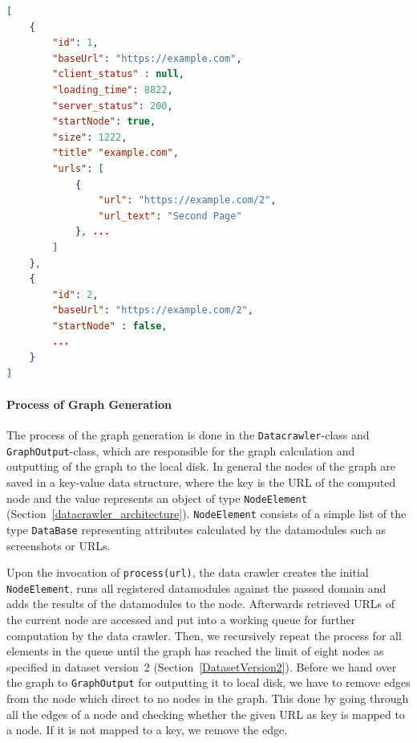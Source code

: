 \begin{lstlisting}[language=json,firstnumber=1,label={lst:examplecom_graph},
    language=Python,
    caption={[Example graph generated by the data crawler]Graph output for the domain \texttt{example.com}. The graph nodes are \texttt{JSON}-objects in the root array of the \texttt{JSON}-file. The \texttt{baseUrl}-attribute shows affiliation of the node to the given URL. Futhermore, each \texttt{JSON}-object consists of attributes mainly calculated in the URL-Datamodule such as client-sided and server-sided error (here: \texttt{client\_status} and \texttt{server\_status}), loading time, size, and the valid URLs with the URL text. In general, all URLs in the nodes are represented as nodes in the graph. Finally, each computed URL has an ID assigned, which represents respectively the name of the screenshots for the URL.},
    captionpos=b]
[
	{
		"id": 1,
		"baseUrl": "https://example.com",
		"client_status" : null,
		"loading_time": 8822,
		"server_status": 200,
		"startNode": true,
		"size": 1222,
		"title" "example.com",
		"urls": [
			{
				"url": "https://example.com/2",
				"url_text": "Second Page"
			}, ...
		]
	},
	{
		"id": 2,
		"baseUrl": "https://example.com/2",
		"startNode" : false,
		...
	}
]
\end{lstlisting}

\paragraph*{Process of Graph Generation} 
The process of the graph generation is done in the \texttt{Datacrawler}-class and \texttt{GraphOutput}-class, which are responsible for the graph calculation and outputting of the graph to the local disk. In general the nodes of the graph are saved in a key-value data structure, where the key is the URL of the computed node and the value represents an object of type \texttt{NodeElement} (Section~\ref{datacrawler_architecture}). \texttt{NodeElement} consists of a simple list of the type \texttt{DataBase} representing attributes calculated by the datamodules such as screenshots or URLs.

Upon the invocation of \texttt{process(url)}, the data crawler creates the initial \texttt{NodeElement}, runs all registered datamodules against the passed domain and adds the results of the datamodules to the node. Afterwards retrieved URLs of the current node are accessed and put into a working queue for further computation by the data crawler. Then, we recursively repeat the process for all elements in the queue until the graph has reached the limit of eight nodes as specified in dataset version~2 (Section~\ref{DatasetVersion2}). Before we hand over the graph to \texttt{GraphOutput} for outputting it to local disk, we have to remove edges from the node which direct to no nodes in the graph. This done by going through all the edges of a node and checking whether the given URL as key is mapped to a node. If it is not mapped to a key, we remove the edge.

